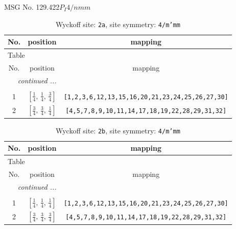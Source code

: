 \documentclass[fleqn,8pt]{jsarticle}
\begin{document}
\setcounter{MaxMatrixCols}{32}

\renewcommand{\tablename}{Table~}
\renewcommand{\figurename}{Figure~}
\begin{center}
\LARGE
MSG No. 129.422\quad$P_{I}4/nmm$
\end{center}
\renewcommand{\arraystretch}{1.2}
\begin{longtable}{ccc}
\caption{Wyckoff site: {\tt 2a}, site symmetry: {\tt 4/m'mm}}
 \\
 \hline \hline
No. & position & mapping \\ \hline \endfirsthead

\multicolumn{2}{l}{\tablename\ \thetable{}} \\
 \hline \hline
No. & position & mapping \\ \hline \endhead

 \hline \hline
\multicolumn{2}{r}{\footnotesize\it continued ...} \\ \endfoot

 \hline \hline
\multicolumn{2}{r}{} \\ \endlastfoot

1 & $\left[ \frac{1}{4},\, \frac{1}{4},\, \frac{3}{4} \right]$ & {\tt [1,2,3,6,12,13,15,16,20,21,23,24,25,26,27,30]} \\ \hline
2 & $\left[ \frac{3}{4},\, \frac{3}{4},\, \frac{1}{4} \right]$ & {\tt [4,5,7,8,9,10,11,14,17,18,19,22,28,29,31,32]} \\
\end{longtable}
\renewcommand{\arraystretch}{1.2}
\begin{longtable}{ccc}
\caption{Wyckoff site: {\tt 2b}, site symmetry: {\tt 4/m'mm}}
 \\
 \hline \hline
No. & position & mapping \\ \hline \endfirsthead

\multicolumn{2}{l}{\tablename\ \thetable{}} \\
 \hline \hline
No. & position & mapping \\ \hline \endhead

 \hline \hline
\multicolumn{2}{r}{\footnotesize\it continued ...} \\ \endfoot

 \hline \hline
\multicolumn{2}{r}{} \\ \endlastfoot

1 & $\left[ \frac{1}{4},\, \frac{1}{4},\, \frac{1}{4} \right]$ & {\tt [1,2,3,6,12,13,15,16,20,21,23,24,25,26,27,30]} \\ \hline
2 & $\left[ \frac{3}{4},\, \frac{3}{4},\, \frac{3}{4} \right]$ & {\tt [4,5,7,8,9,10,11,14,17,18,19,22,28,29,31,32]} \\
\end{longtable}
\end{document}
